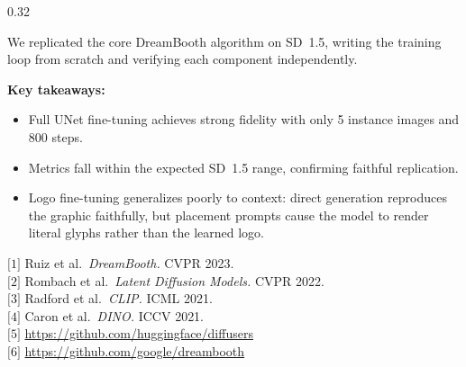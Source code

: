\documentclass[final]{beamer}
\newcommand{\pbox}[2]{%
  \vspace{2pt}
  \begin{tcolorbox}[pstyle,title={#1}]#2
  \end{tcolorbox}\vspace{2pt}%
}
\newenvironment{citemize}{%
\begin{itemize}\setlength{\itemsep}{3pt}\setlength{\parskip}{0pt}\setlength{\topsep}{2pt}%
    }{
\end{itemize}}
\begin{document}
\begin{frame}[t]
\begin{columns}[t]
\begin{column}{0.32\textwidth}
      \pbox{Conclusion}{
        We replicated the core DreamBooth algorithm on SD~1.5, writing the training
        loop from scratch and verifying each component independently.

        \vspace{0.2em}
        \textbf{Key takeaways:}
        \begin{citemize}
        \item Full UNet fine-tuning achieves strong fidelity with only 5 instance
          images and 800 steps.
        \item Metrics fall within the expected SD~1.5 range, confirming faithful
          replication.
        \item Logo fine-tuning generalizes poorly to context: direct generation
          reproduces the graphic faithfully, but placement prompts cause the model to render literal glyphs rather than the learned logo.
        \end{citemize}
      }

      \pbox{References}{\footnotesize{
        $\text{[1]}$ Ruiz et al.\ \textit{DreamBooth.} CVPR 2023.\\
        $\text{[2]}$ Rombach et al.\ \textit{Latent Diffusion Models.} CVPR 2022.\\
        $\text{[3]}$ Radford et al.\ \textit{CLIP.} ICML 2021.\\
        $\text{[4]}$ Caron et al.\ \textit{DINO.} ICCV 2021.\\
        $\text{[5]}$ \url{https://github.com/huggingface/diffusers}\\
        $\text{[6]}$ \url{https://github.com/google/dreambooth}
        }
      }

    \end{column}

  \end{columns}

\end{frame}
\end{document}
